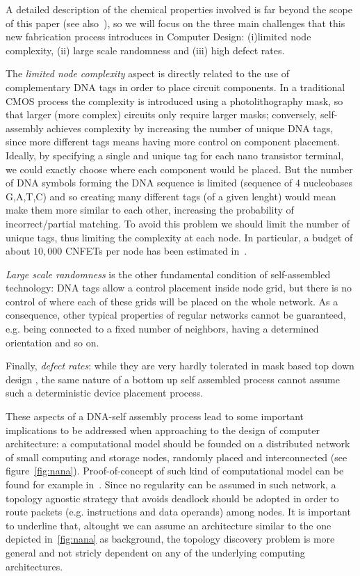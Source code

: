 A detailed description of the chemical properties involved is far
beyond the scope of this paper (see also~\cite{braun1998, seeman1999}), so we will focus on
the three main challenges that this new fabrication process introduces
in Computer Design: (i)limited node complexity, (ii) large scale
randomness and (iii) high defect rates.  

The \emph{limited node complexity} aspect is directly
related to the use of complementary DNA tags in order to place circuit
components. In a traditional CMOS process the complexity is introduced
using a photolithography mask, so that larger (more complex) circuits
only require larger masks; conversely, self-assembly achieves
complexity by increasing the number of unique DNA tags, since more
different tags means having more control on component placement. Ideally, by specifying a single
and unique tag for each nano transistor terminal, we could exactly
choose where each component would be placed. But the number of DNA
symbols forming the DNA sequence is limited (sequence of 4 nucleobases
G,A,T,C) and so creating many different tags (of a given lenght) would
mean make them more similar to each other, increasing the probability
of incorrect/partial matching. To avoid this problem we should limit
the number of unique tags, thus limiting the complexity at each node.
In particular, a budget of about $10,000$ CNFETs per node has been
estimated in~\cite{liu_jetcs}.

\emph{Large scale randomness} is the other fundamental condition of
self-assembled technology: DNA tags allow a control placement inside
node grid, but there is no control of where each of these  grids will
be placed on the whole network. As a consequence, other typical
properties of regular networks cannot be guaranteed, e.g. being
connected to a fixed number of neighbors, having a determined
orientation and so on.

Finally, \emph{defect rates}: while they are very hardly tolerated in mask
based top down design , the same nature of a bottom up self
assembled process cannot assume such a deterministic device placement
process.

These aspects of a DNA-self assembly process lead to some important
implications to be addressed when approaching to the design of
computer architecture: a computational model should be founded on a
distributed network of small computing and storage nodes, randomly
placed and interconnected (see figure~\ref{fig:nana}).
Proof-of-concept of such kind of computational model can be found for
example in~\cite{patwardhan2006_1}.  Since no regularity can be
assumed in such network, a topology agnostic strategy that avoids
deadlock should be adopted in order to route packets (e.g.
instructions and data operands) among nodes.  It is important to
underline that, altought we can assume an architecture similar to the
one depicted in~\ref{fig:nana} as background, the topology discovery
problem is more general and not stricly dependent on any of the
underlying computing architectures.

